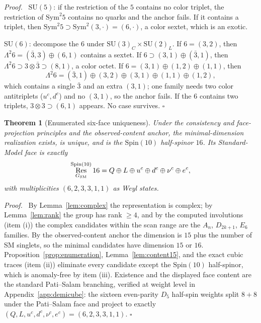 \documentclass[
  aps,
  prd,
  preprint,
  nofootinbib,
  superscriptaddress,
  longbibliography
]{revtex4-2}
\newcommand{\Spin}{\mathrm{Spin}}
\newcommand{\SU}{\mathrm{SU}}
\DeclareMathOperator{\Res}{Res}
\newtheorem{theorem}{Theorem}[section]
\newenvironment{proof}{\par\noindent\textit{Proof.}\ }{\hfill\(\square\)\par}
\begin{document}
\begin{proof}
\(\SU(5)\): if the restriction of the \(5\) contains no color triplet, the
restriction of \(\mathrm{Sym}^2 5\) contains no quarks and the anchor
fails.  If it contains a triplet, then
\(\mathrm{Sym}^2 5\supset\mathrm{Sym}^2(3,\cdot)=(6,\cdot)\), a color
sextet, which is an exotic.

\(\SU(6)\): decompose the \(6\) under \(\SU(3)_C\times\SU(2)_L\).  If
\(6=(3,2)\), then \(\Lambda^2 6=(\bar3,3)\oplus(6,1)\) contains a sextet.
If \(6\supset(3,1)\oplus(\bar3,1)\), then
\(\Lambda^2 6\supset 3\otimes\bar3\supset(8,1)\), a color octet.  If
\(6=(3,1)\oplus(1,2)\oplus(1,1)\), then
\[
  \Lambda^2 6=(\bar3,1)\oplus(3,2)\oplus(3,1)\oplus(1,1)\oplus(1,2),
\]
which contains a single \(\bar3\) and an extra \((3,1)\); one family needs
two color antitriplets (\(u^c,d^c\)) and no \((3,1)\), so the anchor fails.
If the \(6\) contains two triplets, \(3\otimes3\supset(6,1)\) appears.  No
case survives.
\end{proof}

\begin{theorem}[Enumerated six-face uniqueness]
\label{thm:sixface}
Under the consistency and face-projection principles and the
observed-content anchor, the minimal-dimension realization exists, is
unique, and is the \(\Spin(10)\) half-spinor \(16\).  Its Standard-Model
face is exactly
\[
  \Res^{\Spin(10)}_{G_{\rm SM}}16
  =Q\oplus L\oplus u^c\oplus d^c\oplus\nu^c\oplus e^c ,
\]
with multiplicities \((6,2,3,3,1,1)\) as Weyl states.
\end{theorem}

\begin{proof}
By Lemma~\ref{lem:complex} the representation is complex; by
Lemma~\ref{lem:rank} the group has rank \(\ge4\), and by the computed
involutions (item (i)) the complex candidates within the scan range are the
\(A_n\), \(D_{2k+1}\), \(E_6\) families.  By the observed-content anchor
the dimension is \(15\) plus the number of SM singlets, so the minimal
candidates have dimension \(15\) or \(16\).
Proposition~\ref{prop:enumeration}, Lemma~\ref{lem:content15}, and the
exact cubic traces (item (ii)) eliminate every candidate except the
\(\Spin(10)\) half-spinor, which is anomaly-free by item (iii).  Existence
and the displayed face content are the standard Pati--Salam branching,
verified at weight level in Appendix~\ref{app:demicube}: the sixteen
even-parity \(D_5\) half-spin weights split \(8+8\) under the Pati--Salam
face and project to exactly \((Q,L,u^c,d^c,\nu^c,e^c)=(6,2,3,3,1,1)\).
\end{proof}
\end{document}
